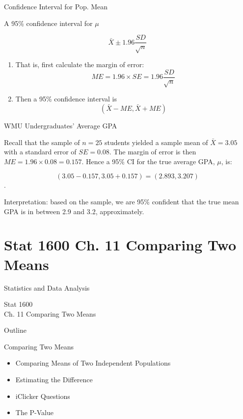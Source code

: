 \documentclass[14pt]{beamer}\usepackage[]{graphicx}\usepackage[]{color}
\begin{document}
\begin{frame}[fragile]{Confidence Interval for Pop. Mean}

A 95\% confidence interval for $\mu$

\begin{equation*}
  \bar{X} \pm 1.96 \frac{SD}{\sqrt{n}}
\end{equation*}

\begin{enumerate}
\item That is, first calculate the margin of error:
\begin{equation*}
ME = 1.96 \times SE = 1.96 \frac{SD}{\sqrt{n}}
\end{equation*}
\item Then a 95\% confidence interval is
\begin{equation*}
(\bar{X} - ME, \bar{X} + ME)
\end{equation*}
\end{enumerate}
\end{frame}

\begin{frame}[fragile]{WMU Undergraduates’ Average GPA}

Recall that the sample of $n = 25$ students yielded a sample mean of $\bar{X} = 3.05$ with a standard error of $SE = 0.08$.  The margin of error is then $ME = 1.96 \times 0.08 = 0.157$. Hence a 95\% CI for the true average  GPA, $\mu$, is:

$$(3.05 - 0.157, 3.05 + 0.157) = (2.893, 3.207)$$.

Interpretation: based on the sample, we are 95\% confident that the  true mean GPA is in between 2.9 and 3.2, approximately.
\end{frame}



\section{Stat 1600 Ch. 11  Comparing Two Means}

\begin{frame}[fragile]{Statistics and Data Analysis}

Stat 1600 \\ Ch. 11  Comparing Two Means

\end{frame}

\begin{frame}[fragile]{Outline}

Comparing Two Means

\begin{itemize}
\item Comparing Means of Two Independent Populations  
\item Estimating the Difference
\item iClicker Questions  
\item The P-Value
\end{itemize}
\end{frame}
\end{document}
